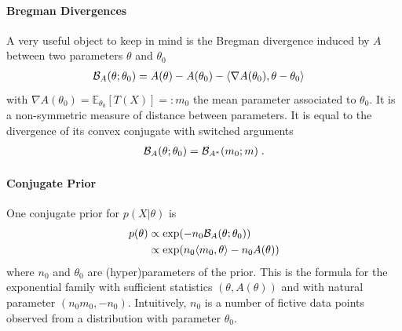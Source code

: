 \documentclass[twoside]{article}
\newcommand*{\expect}[2][]{\ensuremath{\mathbb{E}_{#1} \left[ #2 \right] }} %
\newcommand{\logpart}{A}
\newcommand{\bregman}{\cB_\logpart}
\newcommand{\bregmanconj}{\cB_{\logpart^*}}
\newcommand{\nat}{\theta}
\newcommand{\m}{m}
\newcommand{\meanp}{\m}
\begin{document}
\paragraph{Bregman Divergences}
A very useful object to keep in mind is the Bregman divergence induced by $\logpart$ between two parameters $\nat$ and $\nat_0$
\begin{align}
    \bregman (\nat ; \nat_0)
    & = \logpart(\nat) - \logpart(\nat_0)
    - \langle \nabla \logpart(\nat_0)  , \nat - \nat_0 \rangle
\end{align}
with $\nabla \logpart(\nat_0) = \expect[\nat_0]{T(X)} =: \meanp_0$ the mean parameter associated to $\nat_0$.
It is a non-symmetric measure of distance between parameters.
It is equal to the divergence of its convex conjugate with switched arguments
\begin{align}
	\bregman (\nat ; \nat_0)
    = \bregmanconj ( \meanp_0 ; \meanp) \; .
\end{align}

\paragraph{Conjugate Prior}
One conjugate prior \citep{agarwal2010geometric} for $p(X|\nat)$ is
\begin{align}
    p(\nat)
    &\propto \exp( - n_0 \bregman(\nat ; \nat_0) ) \\
    &\propto \exp(n_0 \langle \m_0, \nat \rangle - n_0 \logpart(\nat))
    \label{eq:def_prior}
\end{align}
where $n_0$ and $\nat_0$ are (hyper)parameters of the prior.
This is the formula for the exponential family with sufficient statistics $(\nat ,\logpart(\nat))$ and with natural parameter $(n_0 \m_0, -n_0)$.
Intuitively, $n_0$ is a number of fictive data points observed from a distribution with parameter $\nat_0$.
\end{document}
